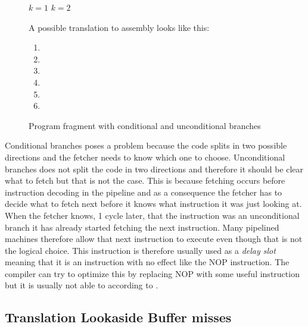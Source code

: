 \begin{figure}\begin{framed}
\begin{algorithmic}
	\State $k = 1$
\Else
	\State $k = 2$
\EndIf
\end{algorithmic}
\vspace{0.3cm}
\noindent
A possible translation to assembly looks like this:
\vspace{0.3cm}
\begin{enumerate}
\item \itab{ }  
\item \itab{ }  
\item {}  
\item \itab{ }  
\item {}  
\item {}
\end{enumerate}
\caption{Program fragment with conditional and unconditional branches}
\label{fig:branchexample}
\end{framed}
\end{figure}


Conditional branches poses a problem because the code splits in two possible directions and the fetcher needs to know which one to choose.
Unconditional branches does not split the code in two directions and therefore it should be clear what to fetch but that is not the case.
This is because fetching occurs before instruction decoding in the pipeline and as a consequence the fetcher has to decide what to fetch next before it knows what instruction it was just looking at.
When the fetcher knows, 1 cycle later, that the instruction was an unconditional branch it has already started fetching the next instruction.
Many pipelined machines therefore allow that next instruction to execute even though that is not the logical choice. This instruction is therefore usually used as a \textit{delay slot} meaning that it is an instruction with no effect like the NOP instruction.
The compiler can try to optimize this by replacing NOP with some useful instruction but it is usually not able to according to \citep[Section 4.5.2]{Tanenbaum}.



\subsection{Translation Lookaside Buffer misses}
